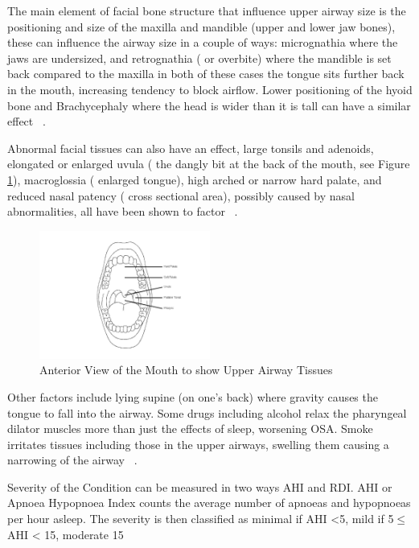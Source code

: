The main element of facial bone structure that influence upper airway size is the positioning and size of the maxilla and mandible (upper and lower jaw bones), these can influence the airway size in a couple of ways: micrognathia where the jaws are undersized, and retrognathia ( or overbite) where the mandible is set back compared to the maxilla in both of these cases the tongue sits further back in the mouth, increasing tendency to block airflow. Lower positioning of the hyoid bone and Brachycephaly where the head is wider than it is tall can have a similar effect ~\cite{lowel1995cephalometric}.

Abnormal facial tissues can also have an effect, large tonsils and adenoids, elongated or enlarged uvula ( the dangly bit at the back of the mouth, see Figure \ref{fig:Anterior-View-Mouth}), macroglossia ( enlarged tongue), high arched or narrow hard palate, and reduced nasal patency ( cross sectional area), possibly caused by nasal abnormalities, all have been shown to factor ~\cite{schwab1995upper}.

\begin{figure}[h]
\centering
\includegraphics[width=0.5\textwidth]{drawings/Anterior-View-Mouth}
\caption{Anterior View of the Mouth to show Upper Airway Tissues~\cite{anteriormouth}}
\label{fig:Anterior-View-Mouth}
\end{figure}

Other factors include lying supine (on one’s back) where gravity causes the tongue to fall into the airway. Some drugs including alcohol relax the pharyngeal dilator muscles more than just the effects of sleep, worsening OSA. Smoke irritates tissues including those in the upper airways, swelling them causing a narrowing of the airway ~\cite{apneosotherfactors}.

 Severity of the Condition can be measured in two ways AHI and RDI. AHI or Apnoea Hypopnoea Index counts the average number of apnoeas and hypopnoeas per hour asleep. The severity is then classified as minimal if AHI <5, mild if 5$\leq$ AHI < 15, moderate 15%

